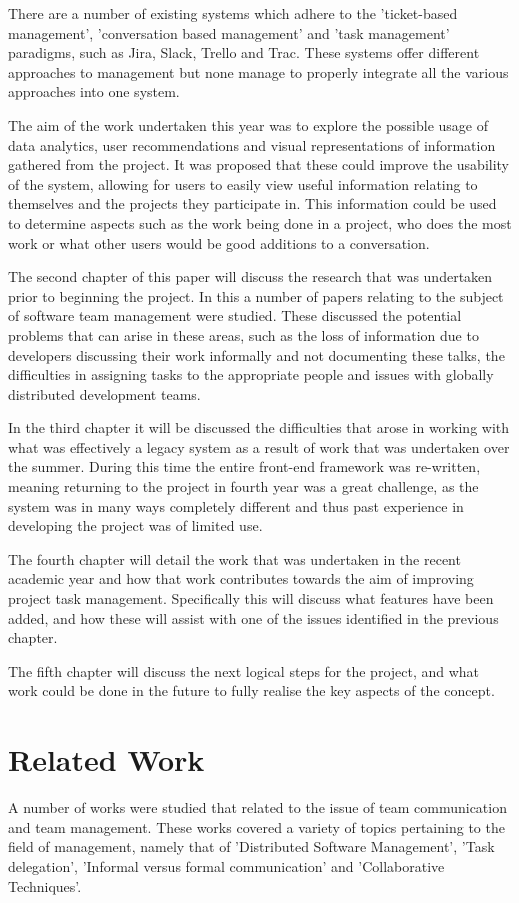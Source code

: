 \documentclass{l4proj}
\begin{document}
There are a number of existing systems which adhere to the 'ticket-based management', 'conversation based management' and 'task management' paradigms, such as Jira, Slack, Trello and Trac.  These systems offer different approaches to management but none manage to properly integrate all the various approaches into one system.

The aim of the work undertaken this year was to explore the possible usage of data analytics, user recommendations and visual representations of information gathered from the project.  It was proposed that these could improve the usability of the system, allowing for users to easily view useful information relating to themselves and the projects they participate in.  This information could be used to determine aspects such as the work being done in a project, who does the most work or what other users would be good additions to a conversation. 

The second chapter of this paper will discuss the research that was undertaken prior to beginning the project. In this a number of papers relating to the subject of software team management were studied.  These discussed the potential problems that can arise in these areas, such as the loss of information due to developers discussing their work informally and not documenting these talks, the difficulties in assigning tasks to the appropriate people and issues with globally distributed development teams.

In the third chapter it will be discussed the difficulties that arose in working with what was effectively a legacy system as a result of work that was undertaken over the summer.  During this time the entire front-end framework was re-written, meaning returning to the project in fourth year was a great challenge, as the system was in many ways completely different and thus past experience in developing the project was of limited use.  

The fourth chapter will detail the work that was undertaken in the recent academic year and how that work contributes towards the aim of improving project task management. Specifically this will discuss what features have been added, and how these will assist with one of the issues identified in the previous chapter.

The fifth chapter will discuss the next logical steps for the project, and what work could be done in the future to fully realise the key aspects of the concept.


\chapter{Related Work}
A number of works were studied that related to the issue of team communication and team management.  These works covered a variety of topics pertaining to the field of management, namely that of 'Distributed Software Management', 'Task delegation', 'Informal versus formal communication' and 'Collaborative Techniques'.
\end{document}
